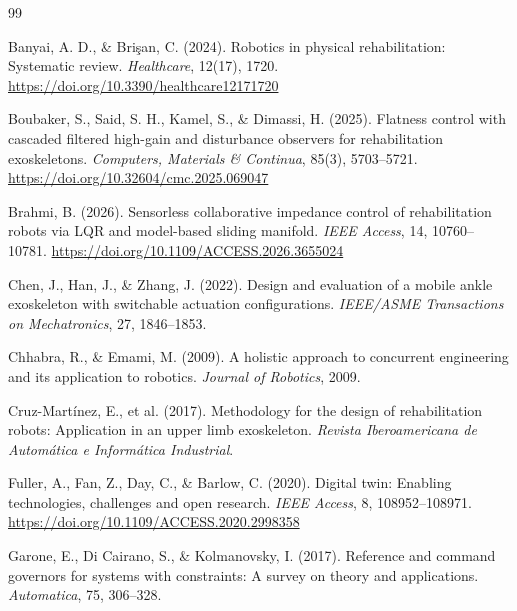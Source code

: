 \documentclass[a4paper,12pt]{article}
\begin{document}
\newpage
\begin{thebibliography}{99}

    Banyai, A. D., \& Bri\c{s}an, C. (2024).
    \newblock Robotics in physical rehabilitation: Systematic review.
    \newblock \emph{Healthcare}, 12(17), 1720.
    \newblock \url{https://doi.org/10.3390/healthcare12171720}

    Boubaker, S., Said, S. H., Kamel, S., \& Dimassi, H. (2025).
    \newblock Flatness control with cascaded filtered high-gain and disturbance observers for rehabilitation exoskeletons.
    \newblock \emph{Computers, Materials \& Continua}, 85(3), 5703--5721.
    \newblock \url{https://doi.org/10.32604/cmc.2025.069047}

    Brahmi, B. (2026).
    \newblock Sensorless collaborative impedance control of rehabilitation robots via LQR and model-based sliding manifold.
    \newblock \emph{IEEE Access}, 14, 10760--10781.
    \newblock \url{https://doi.org/10.1109/ACCESS.2026.3655024}

    Chen, J., Han, J., \& Zhang, J. (2022).
    \newblock Design and evaluation of a mobile ankle exoskeleton with switchable actuation configurations.
    \newblock \emph{IEEE/ASME Transactions on Mechatronics}, 27, 1846--1853.

    Chhabra, R., \& Emami, M. (2009).
    \newblock A holistic approach to concurrent engineering and its application to robotics.
    \newblock \emph{Journal of Robotics}, 2009.

    Cruz-Martínez, E., et al. (2017).
    \newblock Methodology for the design of rehabilitation robots: Application in an upper limb exoskeleton.
    \newblock \emph{Revista Iberoamericana de Automática e Informática Industrial}.

    Fuller, A., Fan, Z., Day, C., \& Barlow, C. (2020).
    \newblock Digital twin: Enabling technologies, challenges and open research.
    \newblock \emph{IEEE Access}, 8, 108952--108971.
    \newblock \url{https://doi.org/10.1109/ACCESS.2020.2998358}

    Garone, E., Di Cairano, S., \& Kolmanovsky, I. (2017).
    \newblock Reference and command governors for systems with constraints: A survey on theory and applications.
    \newblock \emph{Automatica}, 75, 306--328.


\end{thebibliography}
\end{document}
